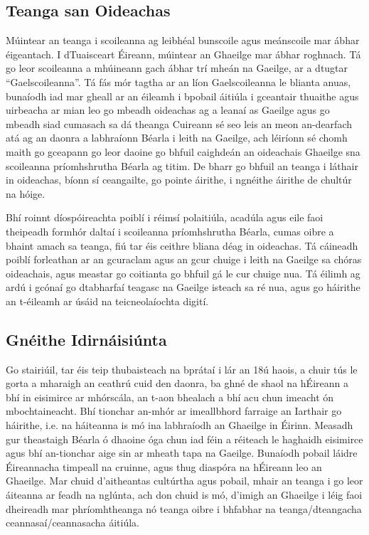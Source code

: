 \begin{multicols}{2}
\subsection{Teanga san Oideachas}

Múintear an teanga i scoileanna ag leibhéal bunscoile agus meánscoile mar ábhar éigeantach. I dTuaisceart Éireann, múintear an Ghaeilge mar ábhar roghnach. Tá go leor scoileanna a mhúineann gach ábhar trí mheán na Gaeilge, ar a dtugtar “Gaelscoileanna”. Tá fás mór tagtha ar an líon Gaelscoileanna le blianta anuas, bunaíodh iad mar gheall ar an éileamh i bpobail áitiúla i gceantair thuaithe agus uirbeacha ar mian leo go mbeadh oideachas ag a leanaí as Gaeilge agus go mbeadh siad cumasach sa dá theanga Cuireann sé seo leis an meon an-dearfach atá ag an daonra a labhraíonn Béarla i leith na Gaeilge, ach léiríonn sé chomh maith go gceapann go leor daoine go bhfuil caighdeán an oideachais Ghaeilge sna scoileanna príomhshrutha Béarla ag titim. De bharr go bhfuil an teanga i láthair in oideachas, bíonn sí ceangailte, go pointe áirithe, i ngnéithe áirithe de chultúr na hóige. 

Bhí roinnt díospóireachta poiblí i réimsí polaitiúla, acadúla agus eile faoi theipeadh formhór daltaí i scoileanna príomhshrutha Béarla, cumas oibre a bhaint amach sa teanga, fiú tar éis ceithre bliana déag in oideachas. Tá cáineadh poiblí forleathan ar an gcuraclam agus an gcur chuige i leith na Gaeilge sa chóras oideachais, agus meastar go coitianta go bhfuil gá le cur chuige nua. Tá éilimh ag ardú i gcónaí go dtabharfaí teagasc na Gaeilge isteach sa ré nua, agus go háirithe an t-éileamh ar úsáid na teicneolaíochta digití.



\subsection{Gnéithe Idirnáisiúnta}

Go stairiúil, tar éis teip thubaisteach na bprátaí i lár an 18ú haois, a chuir tús le gorta a mharaigh an ceathrú cuid den daonra, ba ghné de shaol na hÉireann a bhí in eisimirce ar mhórscála, an t-aon bhealach a bhí acu chun imeacht ón mbochtaineacht. Bhí tionchar an-mhór ar imeallbhord farraige an Iarthair go háirithe, i.e. na háiteanna is mó ina labhraíodh an Ghaeilge in Éirinn.  Measadh gur theastaigh Béarla ó dhaoine óga chun iad féin a réiteach le haghaidh eisimirce agus bhí an-tionchar aige sin ar mheath tapa na Gaeilge. Bunaíodh pobail láidre Éireannacha timpeall na cruinne, agus thug diaspóra na hÉireann leo an Ghaeilge. Mar chuid d’aitheantas cultúrtha agus pobail, mhair an teanga i go leor áiteanna ar feadh na nglúnta, ach don chuid is mó, d’imigh an Ghaeilge i léig faoi dheireadh mar phríomhtheanga nó teanga oibre i bhfabhar na teanga/dteangacha ceannasaí/ceannasacha áitiúla. 


\end{multicols}

